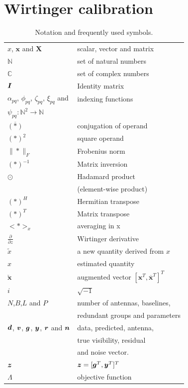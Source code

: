 \documentclass[useAMS,usenatbib]{mn2e}
\newcommand{\bz}{\bmath{z}}
\newcommand{\br}{\bmath{r}}
\newcommand{\bg}{\bmath{g}}
\newcommand{\bd}{\bmath{d}}
\newcommand{\bv}{\bmath{v}}
\newcommand{\bn}{\bmath{n}}
\newcommand{\by}{\bmath{y}}
\newcommand{\bI}{\bmath{I}}
\newcommand{\conj}[1]{\overline{#1}}
\begin{document}
\section{Wirtinger calibration}
\label{sec:sky_wirtinger}

\begin{table}
\centering
\caption{Notation and frequently used symbols.}
\begin{tabular}{|l l|} 
\hline
$x$, $\mathbf{x}$ and $\mathbf{X}$ & scalar, vector and matrix\\
$\mathbb{N}$ & set of natural numbers\\
$\mathbb{C}$ & set of complex numbers\\
$\bI$ & Identity matrix\\
$\alpha_{pq}$, $\phi_{pq}$, $\zeta_{pq}$, $\xi_{pq}$ and & indexing functions\\
$\psi_{pq}:\mathbb{N}^2\rightarrow\mathbb{N}$ &\\
$\conj{(*)}$ & conjugation of operand\\
$(*)^{2}$ & square operand\\
$\|*\|_F$ & Frobenius norm\\
$(*)^{-1}$ & Matrix inversion\\
$\odot$ & Hadamard product\\
&(element-wise product)\\
$(*)^H$ & Hermitian transpose\\
$(*)^T$ & Matrix transpose\\
$<*>_x$ & averaging in x\\
$\frac{\partial}{\partial z}$ & Wirtinger derivative\\
$\widetilde{x}$ & a new quantity derived from $x$\\
$\widehat{x}$ & estimated quantity\\
$\breve{\mathbf{x}}$ & augmented vector $[\mathbf{x}^T,\conj{\mathbf{x}}^T]^T$\\
$i$ & $\sqrt{-1}$\\
$N$,$B$,$L$ and $P$ & number of antennas, baselines,\\
&redundant groups and parameters\\
$\bd$, $\bv$, $\bg$, $\by$, $\br$ and $\bn$& data, predicted, antenna,\\
&true visibility, residual\\
&and noise vector.\\ 
$\bz$ & $\bz = [\bg^T,\by^T]^T$\\
$\Lambda$ & objective function\\

\end{tabular}
\end{table}
\end{document}
